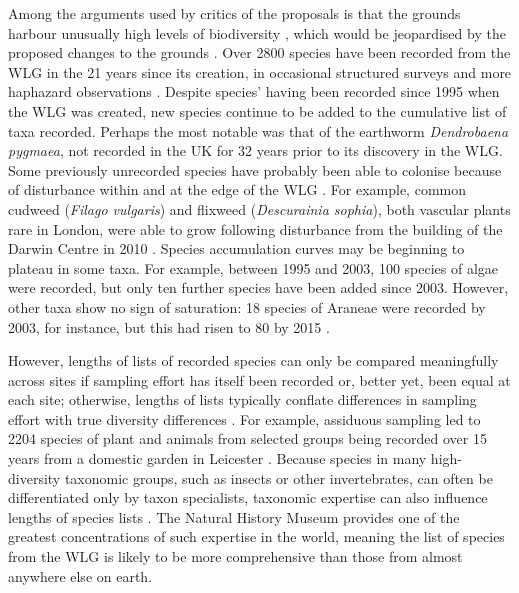 Among the arguments used by critics of the proposals is that the grounds harbour unusually high levels of biodiversity \citep{changepetition:2015wg}, which would be jeopardised by the proposed changes to the grounds \citep{avery:2015wg}. Over 2800 species have been recorded from the WLG in the 21 years since its creation, in occasional structured surveys and more haphazard observations \citep{Ware:2016wlg}. Despite species' having been recorded since 1995 when the WLG was created, new species continue to be added to the cumulative list of taxa recorded. Perhaps the most notable was that of the earthworm \textit{Dendrobaena pygmaea}, not recorded in the UK for 32 years prior to its discovery in the WLG. Some previously unrecorded species have probably been able to colonise because of disturbance within and at the edge of the WLG \citep{Ware:2016wlg}. For example, common cudweed (\textit{Filago vulgaris}) and flixweed (\textit{Descurainia sophia}), both vascular plants rare in London, were able to grow following disturbance from the building of the Darwin Centre in 2010 \citep{Ware:2016wlg}. Species accumulation curves may be beginning to plateau in some taxa. For example, between 1995 and 2003, 100 species of algae were recorded, but only ten further species have been added since 2003. However, other taxa show no sign of saturation: 18 species of Araneae were recorded by 2003, for instance, but this had risen to 80 by 2015 \citep{Ware:2016wlg}.

However, lengths of lists of recorded species can only be compared meaningfully across sites if sampling effort has itself been recorded or, better yet, been equal at each site; otherwise, lengths of lists typically conflate differences in sampling effort with true diversity differences \citep{Gotelli:2001el,Crawley:2005flora}. For example, assiduous sampling led to 2204 species of plant and animals from selected groups being recorded over 15 years from a domestic garden in Leicester \citep{Owen:1991ecology}. Because species in many high-diversity taxonomic groups, such as insects or other invertebrates, can often be differentiated only by taxon specialists, taxonomic expertise can also influence lengths of species lists \citep{Crawley:2005flora}. The Natural History Museum provides one of the greatest concentrations of such expertise in the world, meaning the list of species from the WLG is likely to be more comprehensive than those from almost anywhere else on earth.

